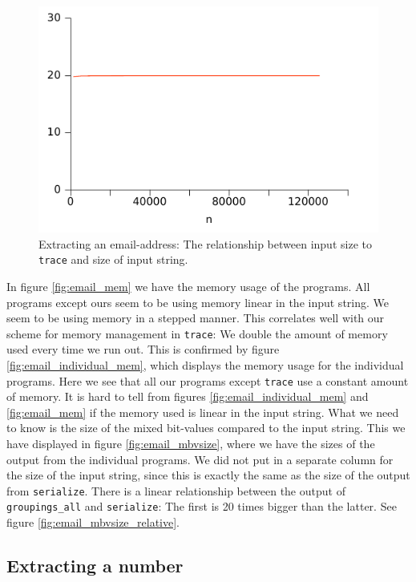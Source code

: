 \begin{figure}
\centering
\includegraphics{benchmarks/memory/email_mbvsize_relative.pdf}
\caption{Extracting an email-address: The relationship between input
  size to \texttt{trace} and size of input string.}
\label{fig:email_mbvsize_relative}
\end{figure}


In figure \vref{fig:email_mem} we have the memory usage of the
programs. All programs except ours seem to be using memory linear in
the input string. We seem to be using memory in a stepped manner. This
correlates well with our scheme for memory management in
\texttt{trace}: We double the amount of memory used every time we run
out. This is confirmed by figure \vref{fig:email_individual_mem},
which displays the memory usage for the individual programs. Here we
see that all our programs except \texttt{trace} use a constant amount
of memory. It is hard to tell from figures
\ref{fig:email_individual_mem} and \vref{fig:email_mem} if the memory
used is linear in the input string. What we need to know is the size
of the mixed bit-values compared to the input string. This we have
displayed in figure \vref{fig:email_mbvsize}, where we have the sizes
of the output from the individual programs. We did not put in a
separate column for the size of the input string, since this is
exactly the same as the size of the output from
\texttt{serialize}. There is a linear relationship between the output
of \texttt{groupings\_all} and \texttt{serialize}: The first is 20
times bigger than the latter. See figure
\vref{fig:email_mbvsize_relative}.

\subsection{Extracting a number}

